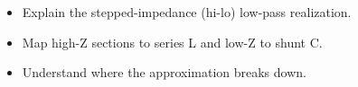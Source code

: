 \begin{objectives}
\begin{itemize}[leftmargin=1.4em,itemsep=2pt]
\item Explain the stepped-impedance (hi-lo) low-pass realization.
\item Map high-Z sections to series L and low-Z to shunt C.
\item Understand where the approximation breaks down.
\end{itemize}
\end{objectives}
